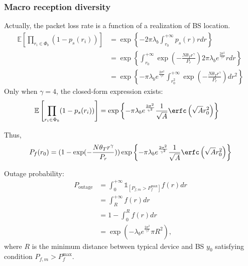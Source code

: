 \subsubsection{Macro reception diversity}
Actually, the packet loss rate is a function of a realization of BS location.
\begin{align}
	\mathbb{E} \left[  \prod_{r_i \in \Phi_{b}} (1-p_{s}(r_i)) \right] &= \exp\left\lbrace -2\pi \lambda_{b} \int_{r_{0}}^{+\infty} p_{s}(r)rdr \right\rbrace \nonumber\\
	&= \exp\left\lbrace  \int_{r_{0}}^{+\infty}  \exp( -\frac{N \theta_{T} r^{\gamma}}{P_{r}}) 2 \pi \lambda_b e^{\frac{2\sigma^2}{\gamma^2}}  rdr  \right\rbrace \nonumber \\ 
	&= \exp\left\lbrace -\pi \lambda_{b} e^{\frac{2\sigma^2}{\gamma^2}}  \int_{r_{0}^{2}}^{+\infty}  \exp( -\frac{N \theta_{T} r^{\gamma}}{P_{r}}) dr^2  \right\rbrace 
\end{align} 
Only when $\gamma = 4$, the closed-form expression exists:
\begin{align}
	\mathbb{E} \left[  \prod_{r_i \in \Phi_{b}} (1-p_{s}(r_i)) \right] &= \exp\left\lbrace -\pi \lambda_{b} e^{\frac{2\sigma^2}{\gamma^2}}  \frac{1}{\sqrt{A}} \erfc\left( \sqrt{A} r_0^2 \right)   \right\rbrace 
\end{align} 

Thus,
\begin{align}
	P_{f}(r_{0}) = ( 1- \exp( -\frac{N \theta_{T} r^{\gamma}}{P_{r}}) )
	\exp\left\lbrace -\pi \lambda_{b} e^{\frac{2\sigma^2}{\gamma^2}}  \frac{1}{\sqrt{A}} \erfc\left( \sqrt{A} r_0^2 \right)   \right\rbrace 
\end{align}


Outage probability:
\begin{align}
	P_{\text{outage}} &= \int_{0}^{+\infty} \mathds{1}_{\left[ P_{f, m} > P_{f}^{\text{max}}\right] }f(r) dr \nonumber \\
	&= \int_{R}^{+\infty} f(r) dr \nonumber \\
	&= 1 - \int_{ 0 }^{ R } f(r) dr \nonumber \\
	&=  \exp( -\lambda_b  e^{\frac{2\sigma^2}{\gamma^2}} \pi R^2 ),
\end{align}
where $R$ is the minimum distance between typical device and BS $y_0$ satisfying condition $P_{f, m} > P_{f}^{\text{max}}$.
